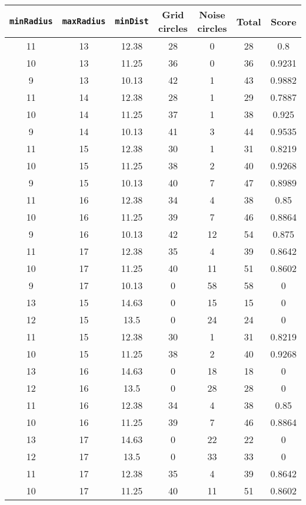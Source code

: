 \documentclass[letterpaper, 12pt]{article}
\begin{document}
\begin{longtable}{|c|c|c|c|c|c|c|}
\hline
\textbf{\texttt{minRadius}} & \textbf{\texttt{maxRadius}} & \textbf{\texttt{minDist}} & \textbf{Grid circles} & \textbf{Noise circles} & \textbf{Total} & \textbf{Score} \\
\hline
11 & 13 & 12.38 & 28 & 0 & 28 & 0.8 \\
\hline
10 & 13 & 11.25 & 36 & 0 & 36 & 0.9231 \\
\hline
9 & 13 & 10.13 & 42 & 1 & 43 & 0.9882 \\
\hline
11 & 14 & 12.38 & 28 & 1 & 29 & 0.7887 \\
\hline
10 & 14 & 11.25 & 37 & 1 & 38 & 0.925 \\
\hline
9 & 14 & 10.13 & 41 & 3 & 44 & 0.9535 \\
\hline
11 & 15 & 12.38 & 30 & 1 & 31 & 0.8219 \\
\hline
10 & 15 & 11.25 & 38 & 2 & 40 & 0.9268 \\
\hline
9 & 15 & 10.13 & 40 & 7 & 47 & 0.8989 \\
\hline
11 & 16 & 12.38 & 34 & 4 & 38 & 0.85 \\
\hline
10 & 16 & 11.25 & 39 & 7 & 46 & 0.8864 \\
\hline
9 & 16 & 10.13 & 42 & 12 & 54 & 0.875 \\
\hline
11 & 17 & 12.38 & 35 & 4 & 39 & 0.8642 \\
\hline
10 & 17 & 11.25 & 40 & 11 & 51 & 0.8602 \\
\hline
9 & 17 & 10.13 & 0 & 58 & 58 & 0 \\
\hline
13 & 15 & 14.63 & 0 & 15 & 15 & 0 \\
\hline
12 & 15 & 13.5 & 0 & 24 & 24 & 0 \\
\hline
11 & 15 & 12.38 & 30 & 1 & 31 & 0.8219 \\
\hline
10 & 15 & 11.25 & 38 & 2 & 40 & 0.9268 \\
\hline
13 & 16 & 14.63 & 0 & 18 & 18 & 0 \\
\hline
12 & 16 & 13.5 & 0 & 28 & 28 & 0 \\
\hline
11 & 16 & 12.38 & 34 & 4 & 38 & 0.85 \\
\hline
10 & 16 & 11.25 & 39 & 7 & 46 & 0.8864 \\
\hline
13 & 17 & 14.63 & 0 & 22 & 22 & 0 \\
\hline
12 & 17 & 13.5 & 0 & 33 & 33 & 0 \\
\hline
11 & 17 & 12.38 & 35 & 4 & 39 & 0.8642 \\
\hline
10 & 17 & 11.25 & 40 & 11 & 51 & 0.8602 \\

\end{longtable}
\end{document}
